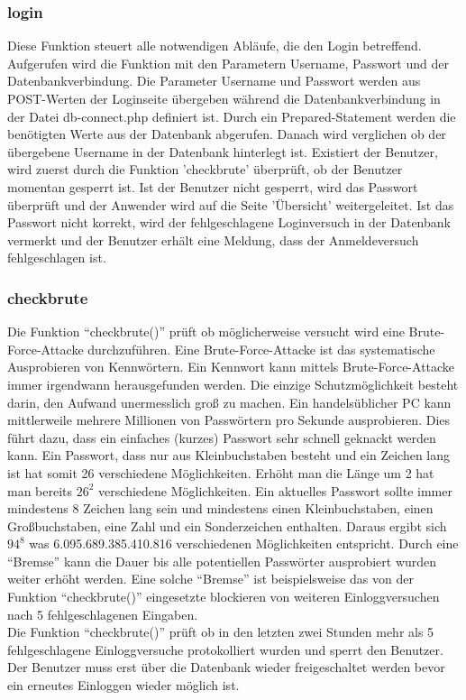\subsubsection{login}
Diese Funktion steuert alle notwendigen Abläufe, die den Login betreffend.\\
Aufgerufen wird die Funktion mit den Parametern Username, Passwort und der Datenbankverbindung. Die Parameter Username und Passwort werden aus POST-Werten der Loginseite übergeben während die Datenbankverbindung in der Datei db-connect.php definiert ist. Durch ein Prepared-Statement werden die benötigten Werte aus der Datenbank abgerufen. Danach wird verglichen ob der übergebene Username in der Datenbank hinterlegt ist. Existiert der Benutzer, wird zuerst durch die Funktion 'checkbrute' überprüft, ob der Benutzer momentan gesperrt ist. Ist der Benutzer nicht gesperrt, wird das Passwort überprüft und der Anwender wird auf die Seite 'Übersicht' weitergeleitet. Ist das Passwort nicht korrekt, wird der fehlgeschlagene Loginversuch in der Datenbank vermerkt und der Benutzer erhält eine Meldung, dass der Anmeldeversuch fehlgeschlagen ist. 

\subsubsection{checkbrute}
Die Funktion "`checkbrute()"' prüft ob möglicherweise versucht wird eine Brute-Force-Attacke durchzuführen. Eine Brute-Force-Attacke ist das systematische Ausprobieren von Kennwörtern. Ein Kennwort kann mittels Brute-Force-Attacke immer irgendwann herausgefunden werden. Die einzige Schutzmöglichkeit besteht darin, den Aufwand unermesslich groß zu machen. Ein handelsüblicher PC kann mittlerweile mehrere Millionen von Passwörtern pro Sekunde ausprobieren. Dies führt dazu, dass ein einfaches (kurzes) Passwort sehr schnell geknackt werden kann. Ein Passwort, dass nur aus Kleinbuchstaben besteht und ein Zeichen lang ist hat somit 26 verschiedene Möglichkeiten. Erhöht man die Länge um 2 hat man bereits $26^2$ verschiedene Möglichkeiten. Ein aktuelles Passwort sollte immer mindestens 8 Zeichen lang sein und mindestens einen Kleinbuchstaben, einen Großbuchstaben, eine Zahl und ein Sonderzeichen enthalten. Daraus ergibt sich $94^8$ was 6.095.689.385.410.816 verschiedenen Möglichkeiten entspricht. Durch eine "`Bremse"' kann die Dauer bis alle potentiellen Passwörter ausprobiert wurden weiter erhöht werden. Eine solche "`Bremse"' ist beispielsweise das von der Funktion "`checkbrute()"' eingesetzte blockieren von weiteren Einloggversuchen nach 5 fehlgeschlagenen Eingaben.\\
Die Funktion "`checkbrute()"' prüft ob in den letzten zwei Stunden mehr als 5 fehlgeschlagene Einloggversuche protokolliert wurden und sperrt den Benutzer. Der Benutzer muss erst über die Datenbank wieder freigeschaltet werden bevor ein erneutes Einloggen wieder möglich ist.

